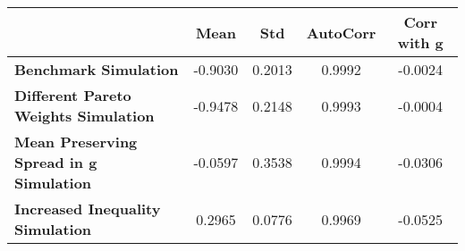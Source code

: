 \begin{tiny}\begin{tabular}{|l|c|c|c|c|}
\hline
&\textbf{Mean}&\textbf{Std}&\textbf{AutoCorr}&\textbf{Corr with g}\\\hline
\textbf{Benchmark Simulation}&-0.9030&0.2013&0.9992&-0.0024\\\hline
\textbf{Different Pareto Weights Simulation}&-0.9478&0.2148&0.9993&-0.0004\\\hline
\textbf{Mean Preserving Spread in g Simulation}&-0.0597&0.3538&0.9994&-0.0306\\\hline
\textbf{Increased Inequality Simulation}&0.2965&0.0776&0.9969&-0.0525\\\hline
\end{tabular}
\end{tiny}